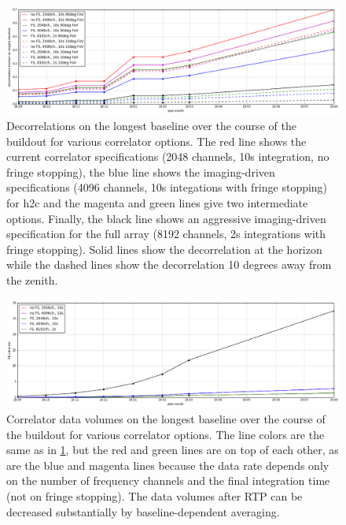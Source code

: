 \documentclass{article}
\begin{document}
\begin{figure}
\includegraphics[width=\textwidth]{spec_calcs/decorrelation.png} 
\caption{Decorrelations on the longest baseline over the course of the buildout for various correlator options. The red line shows the current correlator specifications (2048 channels, 10s integration, no fringe stopping), the blue line shows the imaging-driven specifications (4096 channels, 10s integations with fringe stopping) for h2c and the magenta and green lines give two intermediate options. Finally, the black line shows an aggressive imaging-driven specification for the full array (8192 channels, 2s integrations with fringe stopping). Solid lines show the decorrelation at the horizon while the dashed lines show the decorrelation 10 degrees away from the zenith.}
\label{Fig:decorr}
\end{figure}

\begin{figure}
\includegraphics[width=\textwidth]{spec_calcs/corr_data_vols.png} 
\caption{Correlator data volumes on the longest baseline over the course of the buildout for various correlator options. The line colors are the same as in \ref{Fig:decorr}, but the red and green lines are on top of each other, as are the blue and magenta lines because the data rate depends only on the number of frequency channels and the final integration time (not on fringe stopping). The data volumes after RTP can be decreased substantially by baseline-dependent averaging.}
\label{Fig:corr_vol}
\end{figure}
\end{document}
